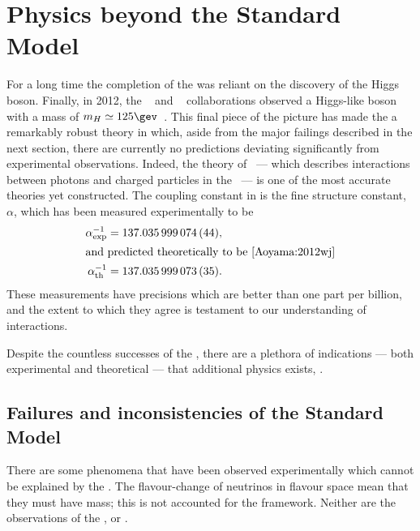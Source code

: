 \section{Physics beyond the Standard Model}
\label{sec:bsm}

For a long time the completion of the \sm was reliant on the discovery of the Higgs boson.
Finally, in 2012, the \cms~\cite{Chatrchyan:2008aa} and \atlas~\cite{Aad:2008zzm} collaborations
observed a Higgs-like boson with a mass of $m_H\simeq125\gev$~\cite{Chatrchyan:2012ufa,Aad:2012tfa}.
This final piece of the picture has made the \sm a remarkably robust theory in which, aside from
the major failings described in the next section, there are currently no predictions deviating
significantly from experimental observations.
Indeed, the theory of \QED~--- which describes interactions between
photons and charged particles in the \sm~--- is one of the most accurate theories yet constructed.
The coupling constant in \QED is the fine structure constant, $\alpha$, which has been measured
experimentally to be~\cite{PDG2012}
\begin{align}
  \alpha^{-1}_\mathrm{exp} &= 137.035\,999\,074\,(44), \nonumber\\
  \intertext{and predicted theoretically to be~\cite{Aoyama:2012wj}}
  \alpha^{-1}_\mathrm{th} &= 137.035\,999\,073\,(35). \nonumber
\end{align}
These measurements have precisions which are better than one part per billion, and the extent to
which they agree is testament to our understanding of \QED interactions.

Despite the countless successes of the \sm, there are a plethora of indications --- both
experimental and theoretical --- that additional physics exists, \bsm.


\subsection{Failures and inconsistencies of the Standard Model}
\label{sec:bsm:fail}
There are some phenomena that have been observed experimentally which cannot be explained by the
\sm.
The flavour-change of neutrinos in flavour space mean that they must have
mass; this is not accounted for the \sm framework.
Neither are the observations of the \BAU, or \dm.

